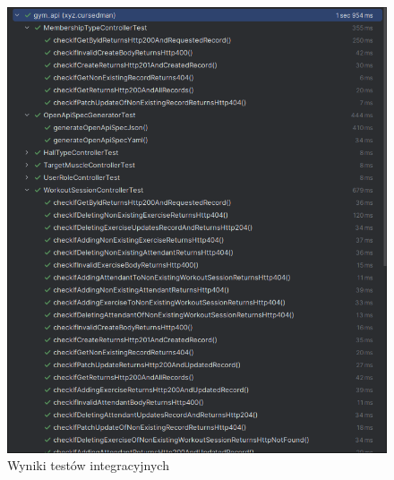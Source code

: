 \documentclass[../../spr.tex]{subfiles}
\begin{document}
\begin{figure}[H]
  \centering
  \includegraphics[width=\textwidth]{tests.png}
  \caption{Wyniki testów integracyjnych}
  \label{fig:test-results}
\end{figure}
\end{document}

